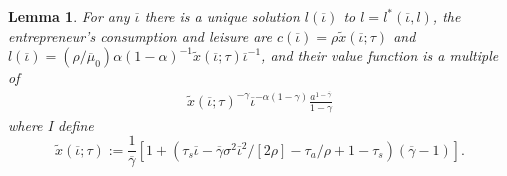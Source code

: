 \documentclass[11pt]{article}
\theoremstyle{plain}
\newtheorem{lemma}[thm]{Lemma}
\begin{document}
\begin{lemma} \label{FIXiota}
For any $\overline{\iota}$ there is a unique solution $l(\overline{\iota})$ to $l = l^*(\overline{\iota}, l)$, the entrepreneur's consumption and leisure are $c(\overline{\iota}) = \rho \tilde{x}(\overline{\iota};\tau)$ and $l(\overline{\iota}) = (\rho/\overline{\mu}_0)\alpha (1-\alpha)^{-1}\tilde{x}(\overline{\iota};\tau)\overline{\iota}^{-1}$, and their value function is a multiple of 
\begin{equation}
\begin{aligned}
\tilde{x}(\overline{\iota};\tau)^{-\gamma} \overline{\iota}^{-\alpha(1-\gamma)} \frac{a^{1-\overline{\gamma}}}{1-\gamma}
\end{aligned}
\label{V}
\end{equation}
where I define
\begin{equation}
\tilde{x}(\overline{\iota}; \tau) := \frac{1}{\overline{\gamma}}{\left[1 + {\left(\tau_s\overline{\iota} - \overline{\gamma}\sigma^2\overline{\iota}^2/[2\rho] -\tau_a/\rho + 1-\tau_s\right)}(\overline{\gamma}-1)\right]}.
\label{x_tilde_func}
\end{equation}
\end{lemma} 
\end{document}

